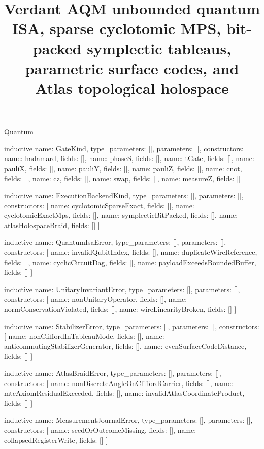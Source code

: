 \begin{lexlean}{Quantum}
\title{Verdant AQM unbounded quantum ISA, sparse cyclotomic MPS, bit-packed symplectic tableaus, parametric surface codes, and Atlas topological holospace}

\begin{semanticmodule}

inductive{
  name: GateKind,
  type_parameters: [],
  parameters: [],
  constructors: [
    {name: hadamard, fields: []},
    {name: phaseS, fields: []},
    {name: tGate, fields: []},
    {name: pauliX, fields: []},
    {name: pauliY, fields: []},
    {name: pauliZ, fields: []},
    {name: cnot, fields: []},
    {name: cz, fields: []},
    {name: swap, fields: []},
    {name: measureZ, fields: []}
  ]
}

inductive{
  name: ExecutionBackendKind,
  type_parameters: [],
  parameters: [],
  constructors: [
    {name: cyclotomicSparseExact, fields: []},
    {name: cyclotomicExactMps, fields: []},
    {name: symplecticBitPacked, fields: []},
    {name: atlasHolospaceBraid, fields: []}
  ]
}

inductive{
  name: QuantumIsaError,
  type_parameters: [],
  parameters: [],
  constructors: [
    {name: invalidQubitIndex, fields: []},
    {name: duplicateWireReference, fields: []},
    {name: cyclicCircuitDag, fields: []},
    {name: payloadExceedsBoundedBuffer, fields: []}
  ]
}

inductive{
  name: UnitaryInvariantError,
  type_parameters: [],
  parameters: [],
  constructors: [
    {name: nonUnitaryOperator, fields: []},
    {name: normConservationViolated, fields: []},
    {name: wireLinearityBroken, fields: []}
  ]
}

inductive{
  name: StabilizerError,
  type_parameters: [],
  parameters: [],
  constructors: [
    {name: nonCliffordInTableauMode, fields: []},
    {name: anticommutingStabilizerGenerator, fields: []},
    {name: evenSurfaceCodeDistance, fields: []}
  ]
}

inductive{
  name: AtlasBraidError,
  type_parameters: [],
  parameters: [],
  constructors: [
    {name: nonDiscreteAngleOnCliffordCarrier, fields: []},
    {name: mtcAxiomResidualExceeded, fields: []},
    {name: invalidAtlasCoordinateProduct, fields: []}
  ]
}

inductive{
  name: MeasurementJournalError,
  type_parameters: [],
  parameters: [],
  constructors: [
    {name: seedOrOutcomeMissing, fields: []},
    {name: collapsedRegisterWrite, fields: []}
  ]
}


\end{semanticmodule}
\end{lexlean}
